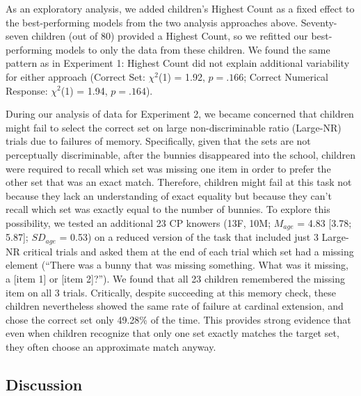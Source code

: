 \documentclass[
  man,floatsintext]{apa7}
\begin{document}
As an exploratory analysis, we added children's Highest Count as a fixed effect to the best-performing models from the two analysis approaches above. Seventy-seven children (out of 80) provided a Highest Count, so we refitted our best-performing models to only the data from these children. We found the same pattern as in Experiment 1: Highest Count did not explain additional variability for either approach (Correct Set: \(\chi^2\)(1) = 1.92, \(p = .166\); Correct Numerical Response: \(\chi^2\)(1) = 1.94, \(p = .164\)).

During our analysis of data for Experiment 2, we became concerned that children might fail to select the correct set on large non-discriminable ratio (Large-NR) trials due to failures of memory. Specifically, given that the sets are not perceptually discriminable, after the bunnies disappeared into the school, children were required to recall which set was missing one item in order to prefer the other set that was an exact match. Therefore, children might fail at this task not because they lack an understanding of exact equality but because they can't recall which set was exactly equal to the number of bunnies. To explore this possibility, we tested an additional 23 CP knowers (13F, 10M; \(M_{age}\) = 4.83 {[}3.78; 5.87{]}; \(SD_{age}\) = 0.53) on a reduced version of the task that included just 3 Large-NR critical trials and asked them at the end of each trial which set had a missing element (``There was a bunny that was missing something. What was it missing, a {[}item 1{]} or {[}item 2{]}?''). We found that all 23 children remembered the missing item on all 3 trials. Critically, despite succeeding at this memory check, these children nevertheless showed the same rate of failure at cardinal extension, and chose the correct set only 49.28\% of the time. This provides strong evidence that even when children recognize that only one set exactly matches the target set, they often choose an approximate match anyway.

\hypertarget{discussion-1}{%
\subsection{Discussion}\label{discussion-1}}
\end{document}
